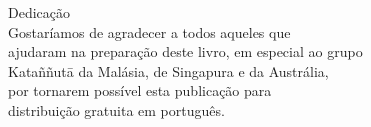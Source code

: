 \cleartorecto
\thispagestyle{empty}

\mbox{}\vfill

\begin{centering}
\itshape

{\upshape Dedicação}\\[0.4\baselineskip]
Gostaríamos de agradecer a todos aqueles que\\
ajudaram na preparação deste livro, em especial ao grupo\\
Kataññutā da Malásia, de Singapura e da Austrália,\\
por tornarem possível esta publicação para\\
distribuição gratuita em português.

\end{centering}

\vfill

\vspace*{6em}
\mbox{}
